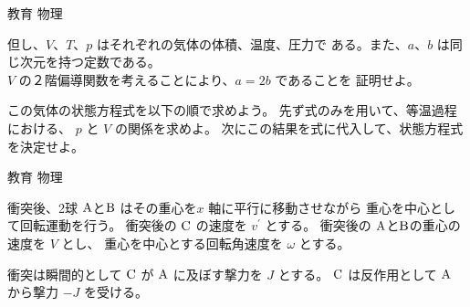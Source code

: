 \documentclass[fleqn]{jbook}
\begin{document}
\begin{question}{教育 物理}{}
\begin{subquestions}
\begin{subsubquestions}
    但し、$V$、$T$、$p$ はそれぞれの気体の体積、温度、圧力で
    ある。また、$a$、$b$ は同じ次元を持つ定数である。\\
    $V$ の２階偏導関数を考えることにより、$a=2b$ であることを
    証明せよ。

  \SubSubQuestion
    この気体の状態方程式を以下の順で求めよう。
    先ず式のみを用いて、等温過程における、
    $p$ と $V$ の関係を求めよ。
    次にこの結果を式に代入して、状態方程式
    を決定せよ。

  \end{subsubquestions}
\end{subquestions}
\end{question}
\begin{answer}{教育 物理}{}
\def\PA{{\rm A}}
\def\PB{{\rm B}}
\def\PC{{\rm C}}

\begin{subanswers}
\SubAnswer

  \begin{subsubanswers}
  \SubSubAnswer
    \parbox[t]{95mm}{
    衝突後、2球 $\PA$と$\PB$ はその重心を$x$ 軸に平行に移動させながら
    重心を中心として回転運動を行う。
%
    衝突後の $\PC$ の速度を $v^\prime$ とする。
    衝突後の $\PA$と$\PB$の重心の速度を $V$ とし、
    重心を中心とする回転角速度を $\omega$ とする。

    衝突は瞬間的として $\PC$ が $\PA$ に及ぼす撃力を $J$ とする。
    $\PC$ は反作用として $\PA$ から撃力 $-J$ を受ける。

}
\end{subsubanswers}
\end{subanswers}
\end{answer}
\end{document}
